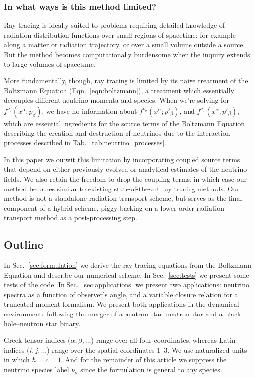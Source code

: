 \documentclass[aps,prd,twocolumn,superscriptaddress]{revtex4-1}
\newcommand{\todo}[1]{\marginpar{\tiny{\textcolor{red}{#1}}}}
\begin{document}
\subsubsection*{In what ways is this method limited?}
Ray tracing is ideally suited to problems requiring detailed knowledge of
radiation distribution functions over small regions of spacetime:
for example along a matter or radiation trajectory,
or over a small volume outside a source.
But the method becomes computationally burdensome when the inquiry extends
to large volumes of spacetime.

More fundamentally, though, ray tracing is limited by its naive
treatment of the Boltzmann Equation (Eqn.~\ref{eqn:boltzmann}),
a treatment which essentially decouples different neutrino momenta and species.
\todo{clarify how momenta are decoupled}
When we're solving for $f^{\nu_\sigma}(x^\alpha;p_\beta)$, we have no
information about $f^{\nu_\sigma}(x^\alpha;p'_\beta)$, and
$f^{\bar{\nu}_\sigma}(x^\alpha;p'_\beta)$, which are essential ingredients
for the source terms of the Boltzmann Equation describing the creation and
destruction of neutrinos due to the interaction processes described in
Tab.~\ref{tab:neutrino_processes}.

In this paper we outwit this limitation by incorporating coupled source terms
that depend on either previously-evolved or analytical
estimates of the neutrino fields.
We also retain the freedom to drop the coupling terms, in which case our method
becomes similar to existing state-of-the-art ray tracing methods.
Our method is not a standalone radiation transport scheme,
but serves as the final component of a hybrid scheme,
piggy-backing on a lower-order radiation transport method as a
post-processing step.

\subsection{Outline}
In Sec.~\ref{sec:formulation} we derive the ray tracing equations from the
Boltzmann Equation and describe our numerical scheme.
In Sec.~\ref{sec:tests} we present some tests of the code.
In Sec.~\ref{sec:applications} we present two applications:
neutrino spectra as a function of observer's angle, and
a variable closure relation for a truncated moment formalism.
We present both applications in the dynamical environments following the merger
of a neutron star--neutron star and a black hole--neutron star binary.

Greek tensor indices ($\alpha, \beta, ...$) range over all four coordinates,
whereas Latin indices ($i, j, ...$) range over the spatial coordinates 1--3.
We use naturalized units in which $\hbar=c=1$.
And for the remainder of this article we suppress the neutrino species label
$\nu_\sigma$ since the formulation is general to any species.
\end{document}
